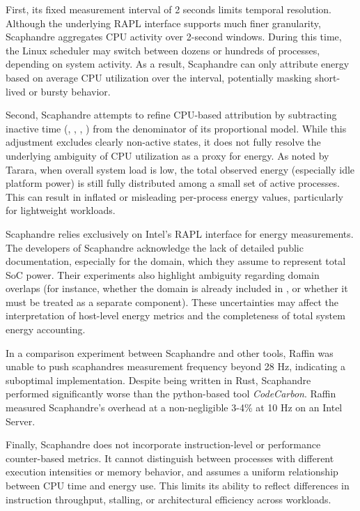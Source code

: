 First, its fixed measurement interval of 2 seconds limits temporal resolution. Although the underlying RAPL interface supports much finer granularity, Scaphandre aggregates CPU activity over 2-second windows. During this time, the Linux scheduler may switch between dozens or hundreds of processes, depending on system activity. As a result, Scaphandre can only attribute energy based on average CPU utilization over the interval, potentially masking short-lived or bursty behavior.

Second, Scaphandre attempts to refine CPU-based attribution by subtracting inactive time (, , , ) from the denominator of its proportional model. While this adjustment excludes clearly non-active states, it does not fully resolve the underlying ambiguity of CPU utilization as a proxy for energy. As noted by Tarara\parencite{Tarara2023CpuUtilization}, when overall system load is low, the total observed energy (especially idle platform power) is still fully distributed among a small set of active processes. This can result in inflated or misleading per-process energy values, particularly for lightweight workloads.

Scaphandre relies exclusively on Intel’s RAPL interface for energy measurements. The developers of Scaphandre acknowledge the lack of detailed public documentation, especially for the  domain, which they assume to represent total SoC power. Their experiments also highlight ambiguity regarding domain overlaps (for instance, whether the  domain is already included in , or whether it must be treated as a separate component). These uncertainties may affect the interpretation of host-level energy metrics and the completeness of total system energy accounting.

In a comparison experiment between Scaphandre and other tools, Raffin\parencite{raffin2024dissecting} was unable to push scaphandres measurement frequency beyond 28 Hz, indicating a suboptimal implementation. Despite being written in Rust, Scaphandre performed significantly worse than the python-based tool \textit{CodeCarbon}. Raffin measured Scaphandre's overhead at a non-negligible 3-4\% at 10 Hz on an Intel Server.

Finally, Scaphandre does not incorporate instruction-level or performance counter-based metrics. It cannot distinguish between processes with different execution intensities or memory behavior, and assumes a uniform relationship between CPU time and energy use. This limits its ability to reflect differences in instruction throughput, stalling, or architectural efficiency across workloads.

